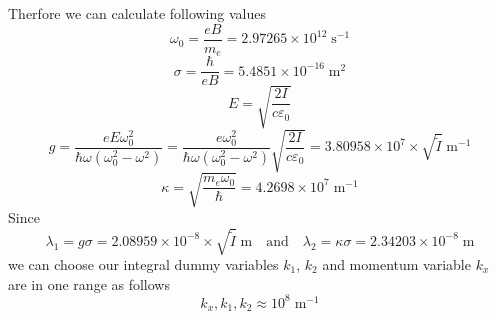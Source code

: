 \noindent
Therfore we can calculate following values
\begin{equation} \label{5.17}
  \omega_0 = \frac{eB}{m_e} = 2.97265 \times 10^{12}\; \text{s}^{-1}
\end{equation}
\begin{equation} \label{5.18}
  \sigma = \frac{\hbar}{eB} = 5.4851 \times 10^{-16}\; \text{m}^{2}
\end{equation}
\begin{equation} \label{5.19}
  E = \sqrt{\frac{2I}{c\varepsilon_0}}
\end{equation}
\begin{equation} \label{5.20}
  g = \frac{eE\omega_0^2}{\hbar\omega(\omega_0^2 - \omega^2)}
  = \frac{e\omega_0^2}{\hbar\omega(\omega_0^2 - \omega^2)}  \sqrt{\frac{2I}{c\varepsilon_0}}
  = 3.80958 \times 10^{7}\times \sqrt{\tilde{I}}\; \text{m}^{-1}
\end{equation}
\begin{equation} \label{5.21}
  \kappa = \sqrt{\frac{m_e \omega_0}{\hbar}}
  = 4.2698 \times 10^{7}\; \text{m}^{-1}
\end{equation}
Since
\begin{equation} \label{5.22}
  \lambda_1 = g\sigma
  = 2.08959 \times 10^{-8} \times \sqrt{\tilde{I}}\; \text{m} \quad \text{and} \quad
  \lambda_2 = \kappa\sigma = 2.34203 \times 10^{-8}\; \text{m}
\end{equation}
we can choose our integral dummy variables $k_1$, $k_2$ and momentum variable $k_x$ are in one range as follows
\begin{equation} \label{5.23}
  k_x,k_1,k_2 \approx 10^{8}\; \text{m}^{-1}
\end{equation}


